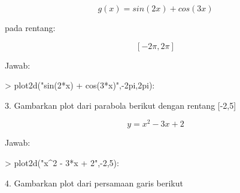 \documentclass{report}
\begin{document}
\begin{eulernotebook}
\begin{eulercomment}
\begin{eulercomment}
\begin{eulercomment}
\begin{eulercomment}
\begin{eulercomment}
\begin{eulercomment}
\begin{eulercomment}
\end{eulercomment}
\begin{eulerformula}
\[
g(x) = sin(2x) + cos(3x)
\]
\end{eulerformula}
\begin{eulercomment}
\end{eulercomment}
\begin{eulerttcomment}
   pada rentang:
\end{eulerttcomment}
\begin{eulercomment}
\end{eulercomment}
\begin{eulerformula}
\[
[-2 \pi,2 \pi]
\]
\end{eulerformula}
\begin{eulercomment}
Jawab:
\end{eulercomment}
\begin{eulerprompt}
> plot2d("sin(2*x) + cos(3*x)",-2pi,2pi):
\end{eulerprompt}
\begin{eulercomment}
3. Gambarkan plot dari parabola berikut dengan rentang [-2,5]

\end{eulercomment}
\begin{eulerformula}
\[
y = x^2 - 3x + 2
\]
\end{eulerformula}
\begin{eulercomment}
Jawab:
\end{eulercomment}
\begin{eulerprompt}
> plot2d("x^2 - 3*x + 2",-2,5):
\end{eulerprompt}
\begin{eulercomment}
4. Gambarkan plot dari persamaan garis berikut


\end{eulercomment}
\end{eulercomment}
\end{eulercomment}
\end{eulercomment}
\end{eulercomment}
\end{eulercomment}
\end{eulercomment}
\end{eulernotebook}
\end{document}
